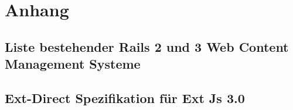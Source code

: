 \chapter{Anhang}
\section{Liste bestehender Rails 2 und 3 Web Content Management Systeme}
\section{Ext-Direct Spezifikation für Ext Js 3.0}



